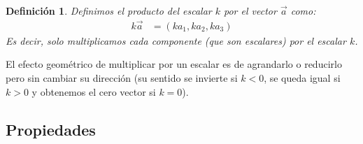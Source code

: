\documentclass[12pt, fleqn]{report}                             %
\newtheorem{Definition}{Definición}[section]                    %
\begin{document}
            \begin{Definition}
                Definimos el producto del escalar $k$ por el vector $\vec{a}$ como:
                \begin{align}
                    k\vec{a} &= (ka_1, ka_2, ka_3) \label{defMult}
                \end{align}
                Es decir, solo multiplicamos cada componente (que son escalares) por el escalar $k$.
            \end{Definition}
            El efecto geométrico de multiplicar por un escalar es de agrandarlo o reducirlo pero sin cambiar su dirección (su sentido se invierte si $k<0$, se queda igual si $k>0$ y obtenemos el cero vector si $k=0$).
            
            \subsection{Propiedades}
            
\end{document}
